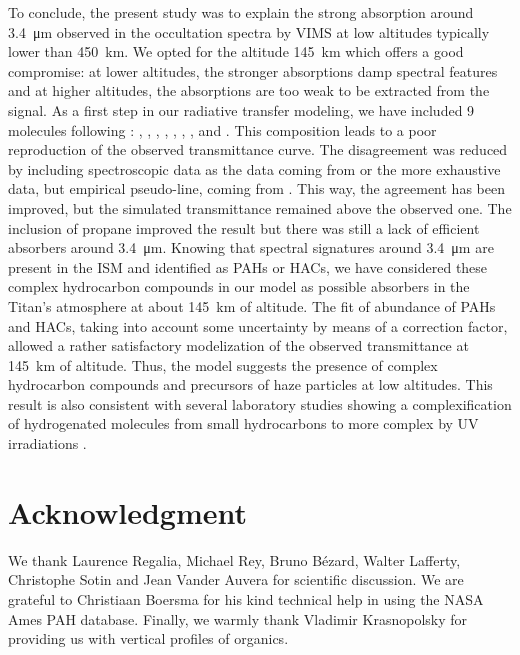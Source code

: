 \documentclass{arxiv-icarus}
\begin{document}
To conclude, the present study was to explain the strong absorption around \SI{3.4}{\um} observed in the occultation spectra by VIMS at low altitudes typically lower than \SI{450}{km}. We opted for the altitude \SI{145}{km} which offers a good compromise: at lower altitudes, the stronger absorptions damp spectral features and at higher altitudes, the absorptions are too weak to be extracted from the signal. As a first step in our radiative transfer modeling, we have included 9 molecules following \cite{Maltagliati2015}: , , , , , , ,  and . This composition leads to a poor reproduction of the observed transmittance curve. The disagreement was reduced by including  spectroscopic data as the data coming from \cite{Pine1982} or the more exhaustive data, but empirical pseudo-line, coming from \cite{Harrison2010}. This way, the agreement has been improved, but the simulated transmittance remained above the observed one. The inclusion of propane improved the result but there was still a lack of efficient absorbers around \SI{3.4}{\um}. Knowing that spectral signatures around \SI{3.4}{\um} are present in the ISM and identified as PAHs or HACs, we have considered these complex hydrocarbon compounds in our model as possible absorbers in the Titan's atmosphere at about \SI{145}{km} of altitude. The fit of abundance of PAHs and HACs, taking into account some uncertainty by means of a correction factor, allowed a rather satisfactory modelization of the observed transmittance at \SI{145}{km} of altitude. Thus, the model suggests the presence of complex hydrocarbon compounds and precursors of haze particles at low altitudes. This result is also consistent with several laboratory studies showing a complexification of hydrogenated molecules from small hydrocarbons to more complex by UV irradiations \citep{Yoon2014,Couturier-Tamburelli2015,Couturier-Tamburelli2018,Carrasco2018}.


\clearpage

\section*{Acknowledgment}

We thank Laurence Regalia, Michael Rey, Bruno B\'{e}zard, Walter Lafferty, Christophe Sotin and Jean Vander Auvera for scientific discussion. We are grateful to Christiaan Boersma for his kind technical help in using the NASA Ames PAH database. Finally, we warmly thank Vladimir Krasnopolsky for providing us with vertical profiles of organics.
\end{document}

